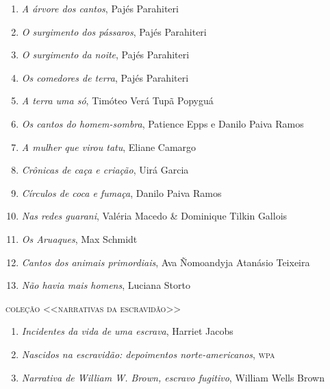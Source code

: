 \begin{enumerate}
\setlength\parskip{4.2pt}
\setlength\itemsep{-1.4mm}
\item \textit{A árvore dos cantos}, Pajés Parahiteri
\item \textit{O surgimento dos pássaros}, Pajés Parahiteri
\item \textit{O surgimento da noite}, Pajés Parahiteri
\item \textit{Os comedores de terra}, Pajés Parahiteri
\item \textit{A terra uma só}, Timóteo Verá Tupã Popyguá
\item \textit{Os cantos do homem-sombra}, Patience Epps e Danilo Paiva Ramos
\item \textit{A mulher que virou tatu}, Eliane Camargo
\item \textit{Crônicas de caça e criação}, Uirá Garcia
\item \textit{Círculos de coca e fumaça}, Danilo Paiva Ramos
\item \textit{Nas redes guarani}, Valéria Macedo \& Dominique Tilkin Gallois
\item \textit{Os Aruaques}, Max Schmidt
\item \textit{Cantos dos animais primordiais}, Ava Ñomoandyja Atanásio Teixeira
\item \textit{Não havia mais homens}, Luciana Storto
\end{enumerate}



\medskip
{\large\textsc{coleção <<narrativas da escravidão>>}}

\begin{enumerate}
\setlength\parskip{4.2pt}
\setlength\itemsep{-1.4mm}
\item \textit{Incidentes da vida de uma escrava}, Harriet Jacobs
\item \textit{Nascidos na escravidão: depoimentos norte-americanos}, \textsc{wpa}
\item \textit{Narrativa de William W. Brown, escravo fugitivo}, William Wells Brown
\end{enumerate}

